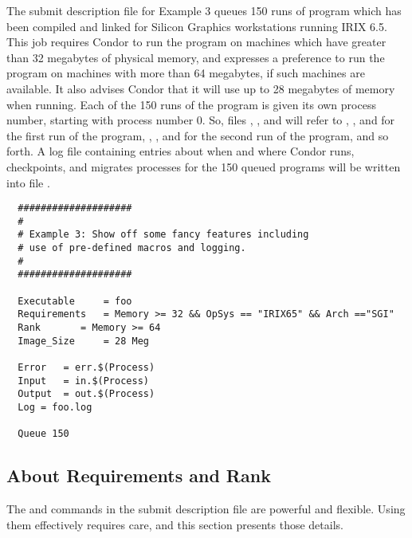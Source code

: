 The submit description file for Example 3 queues 150
runs of program  which has been compiled and linked for
Silicon Graphics workstations running IRIX 6.5. 
This job requires Condor to run the program on machines which have
greater than 32 megabytes of physical memory, and expresses a
preference to run the program on machines with more than 64 megabytes,
if such machines are available.  It also advises Condor that it will
use up to 28 megabytes of memory when running.
Each of the 150 runs of the program is given its own process number,
starting with process number 0.
So, files 
, , and  will
refer to , , and  for the first run
of the program,
, ,
and  for the second run of the program, and so forth.
A log file containing entries
about when and where Condor runs, checkpoints, and migrates processes for
the 150 queued programs
will be written into file .
\begin{verbatim}
  ####################                    
  #
  # Example 3: Show off some fancy features including
  # use of pre-defined macros and logging.
  #
  ####################                                                    

  Executable     = foo                                                    
  Requirements   = Memory >= 32 && OpSys == "IRIX65" && Arch =="SGI"     
  Rank		 = Memory >= 64
  Image_Size     = 28 Meg                                                 

  Error   = err.$(Process)                                                
  Input   = in.$(Process)                                                 
  Output  = out.$(Process)                                                
  Log = foo.log

  Queue 150
\end{verbatim}


\subsection{About Requirements and Rank}

The 
 and  commands in the submit description file
are powerful and flexible. 
Using them effectively requires care, and this section presents
those details.

